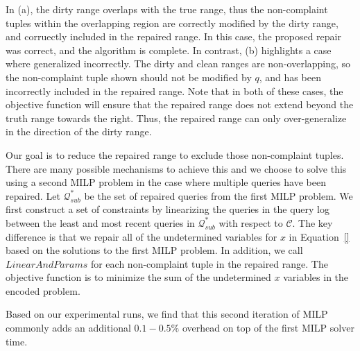 In (a), the dirty range overlaps with the true range, thus the non-complaint tuples 
within the overlapping region are correctly modified by the dirty range, and corruectly included
in the repaired range.  In this case, the proposed repair was correct, and the algorithm is complete.
In contrast, (b) highlights a case where \sys generalized incorrectly.
The dirty and clean ranges are non-overlapping, so the non-complaint tuple shown should not 
be modified by $q$, and has been incorrectly included in the repaired range.
Note that in both of these cases, the objective function will ensure that the repaired range 
does not extend beyond the truth range towards the right.  Thus, the repaired range
can only over-generalize in the direction of the dirty range.

Our goal is to reduce the repaired range to exclude those non-complaint tuples.  
There are many possible mechanisms to achieve this and we choose to solve this using
a second MILP problem in the case where multiple queries have been repaired.
Let $\mathcal{Q}^*_{sub}$ be the set of repaired queries from the first MILP problem.
We first construct a set of constraints by linearizing the queries in the query log
between the least and most recent queries in $\mathcal{Q}^*_{sub}$ with respect to $\mathcal{C}$.
The key difference is that we repair all of the undetermined variables for $x$ in Equation~\ref{}
based on the solutions to the first MILP problem.  
In addition, we call $LinearAndParams$ for each non-complaint tuple in the repaired range.
The objective function is to minimize the sum of the undetermined $x$ variables in the encoded
problem.

Based on our experimental runs, we find that this second iteration of MILP 
commonly adds an additional $0.1-0.5\%$ overhead on top of the first MILP solver time.




